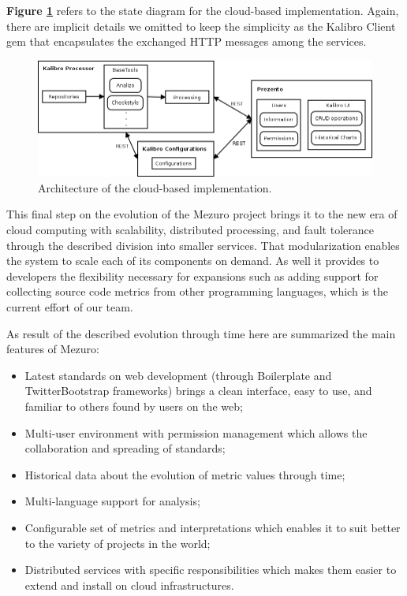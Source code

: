 \textbf{Figure \ref{fig:mezuro-cloud-arch}} refers to the state diagram for the
cloud-based implementation. Again, there are implicit details we omitted to
keep the simplicity as the Kalibro Client gem that encapsulates the exchanged
HTTP messages among the services.

\begin{figure}[htb]
  \centering
  \includegraphics[width=\textwidth]{images/mezuro-cloud-arch.png}
  \caption{Architecture of the cloud-based implementation.}
  \label{fig:mezuro-cloud-arch}
\end{figure}

This final step on the evolution of the Mezuro project brings it to the new era
of cloud computing with scalability, distributed processing, and fault
tolerance through the described division into smaller services. That
modularization enables the system to scale each of its components on demand. As
well it provides to developers the flexibility necessary for expansions such as
adding support for collecting source code metrics from other programming
languages, which is the current effort of our team.

As result of the described evolution through time here are summarized the main
features of Mezuro:

\begin{itemize}

  \item Latest standards on web development (through Boilerplate and
	TwitterBootstrap frameworks) brings a clean interface, easy to use, and familiar
	to others found by users on the web;

  \item Multi-user environment with permission management which allows the
	collaboration and spreading of standards;

  \item Historical data about the evolution of metric values through time;

  \item Multi-language support for analysis;

  \item Configurable set of metrics and interpretations which enables it to
	suit better to the variety of projects in the world;

  \item Distributed services with specific responsibilities which makes them
	easier to extend and install on cloud infrastructures.

\end{itemize}
